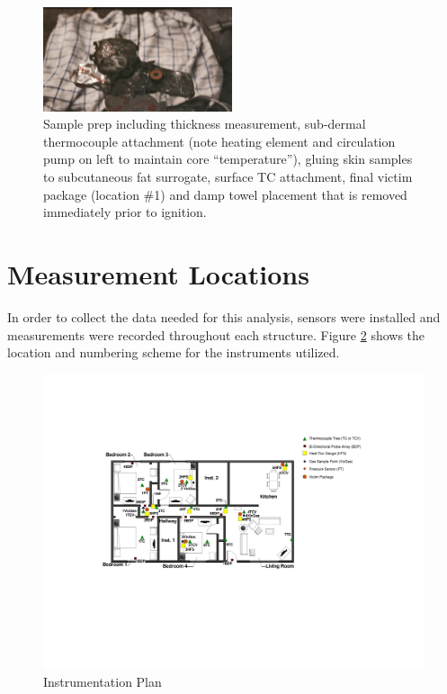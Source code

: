 \documentclass[12pt,oneside]{book}
\begin{document}
\begin{figure}[H]
\includegraphics[width=0.495\textwidth]{../0_Images/Instrumentation/Burn_Measurements/SBA_Damp_Towel}
\caption{Sample prep including thickness measurement, sub-dermal thermocouple attachment (note heating element and circulation pump on left to maintain core ``temperature''), gluing skin samples to subcutaneous fat surrogate, surface TC attachment, final victim package (location \#1) and damp towel placement that is removed immediately prior to ignition.}
\label{fig:inst_SBA_Prep}
\end{figure}


\section{Measurement Locations}

In order to collect the data needed for this analysis, sensors were installed and measurements were recorded throughout each structure. Figure \ref{fig:instruments} shows the location and numbering scheme for the instruments utilized. 

\begin{figure}[H]
\includegraphics[width=.75\textheight]{0_Images/Ranch_Pictures/Instrument_Plan}
\caption{Instrumentation Plan}
\label{fig:instruments}
\end{figure}
\end{document}
